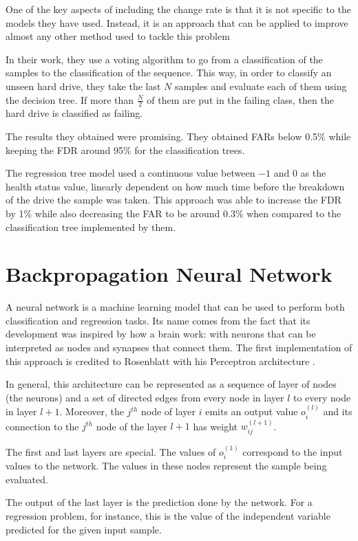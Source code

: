 One of the key aspects of including the change rate is that it is not specific to the models they have used.
Instead, it is an approach that can be applied to improve almost any other method used to tackle this problem 

In their work, they use a voting algorithm to go from a classification of the samples to the classification of the sequence.
This way, in order to classify an unseen hard drive, they take the last $N$ samples and evaluate each of them using the decision tree.
If more than $\frac{N}{2}$ of them are put in the failing class, then the hard drive is classified as failing.

The results they obtained were promising.
They obtained FARs below 0.5\% while keeping the FDR around 95\% for the classification trees.

The regression tree model used a continuous value between $-1$ and $0$ as the health status value, linearly dependent on how much time before the breakdown of the drive the sample was taken.
This approach was able to increase the FDR by 1\% while also decreasing the FAR to be around 0.3\% when compared to the classification tree implemented by them.

\section{Backpropagation Neural Network}\label{sec:BackpropagationNeuralNetwork}

A neural network is a machine learning model that can be used to perform both classification and regression tasks.
Its name comes from the fact that its development was inspired by how a brain work: with neurons that can be interpreted as nodes and synapses that connect them.
The first implementation of this approach is credited to Rosenblatt with his Perceptron architecture \cite{rosenblatt1957perceptron}.

In general, this architecture can be represented as a sequence of layer of nodes (the neurons) and a set of directed edges from every node in layer $l$ to every node in layer $l+1$.
Moreover, the $j^{th}$ node of layer $i$ emits an output value $o^{(l)}_i$ and its connection to the $j^{th}$ node of the layer $l+1$ has weight $w^{(l+1)}_{ij}$.

The first and last layers are special.
The values of $o^{(1)}_i$ correspond to the input values to the network.
The values in these nodes represent the sample being evaluated.

The output of the last layer is the prediction done by the network.
For a regression problem, for instance, this is the value of the independent variable predicted for the given input sample.

